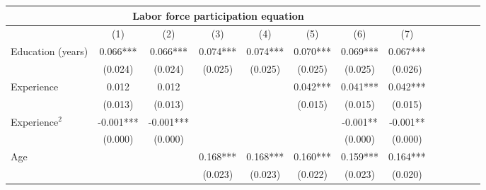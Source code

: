 \begin{center}
\begin{table}[th]
{\begin{tabular}{lcccccccccccc}
\multicolumn{8}{c}{\textbf{Labor force participation equation}}\\
\hline
\multicolumn{1}{c}{} &
  \multicolumn{1}{c}{(1)} &
  \multicolumn{1}{c}{(2)} &
  \multicolumn{1}{c}{(3)} &
  \multicolumn{1}{c}{(4)} &
  \multicolumn{1}{c}{(5)} &
  \multicolumn{1}{c}{(6)} &
  \multicolumn{1}{c}{(7)} \\
\cline{1-8}
\multicolumn{1}{l}{Education (years)} &
  \multicolumn{1}{c}{0.066***} &
  \multicolumn{1}{c}{0.066***} &
  \multicolumn{1}{c}{0.074***} &
  \multicolumn{1}{c}{0.074***} &
  \multicolumn{1}{c}{0.070***} &
  \multicolumn{1}{c}{0.069***} &
  \multicolumn{1}{c}{0.067***} \\
\multicolumn{1}{l}{} &
  \multicolumn{1}{c}{(0.024)} &
  \multicolumn{1}{c}{(0.024)} &
  \multicolumn{1}{c}{(0.025)} &
  \multicolumn{1}{c}{(0.025)} &
  \multicolumn{1}{c}{(0.025)} &
  \multicolumn{1}{c}{(0.025)} &
  \multicolumn{1}{c}{(0.026)} \\
\multicolumn{1}{l}{Experience} &
  \multicolumn{1}{c}{0.012} &
  \multicolumn{1}{c}{0.012} &
  \multicolumn{1}{c}{} &
  \multicolumn{1}{c}{} &
  \multicolumn{1}{c}{0.042***} &
  \multicolumn{1}{c}{0.041***} &
  \multicolumn{1}{c}{0.042***} \\
\multicolumn{1}{l}{} &
  \multicolumn{1}{c}{(0.013)} &
  \multicolumn{1}{c}{(0.013)} &
  \multicolumn{1}{c}{} &
  \multicolumn{1}{c}{} &
  \multicolumn{1}{c}{(0.015)} &
  \multicolumn{1}{c}{(0.015)} &
  \multicolumn{1}{c}{(0.015)} \\
\multicolumn{1}{l}{Experience$^2$} &
  \multicolumn{1}{c}{-0.001***} &
  \multicolumn{1}{c}{-0.001***} &
  \multicolumn{1}{c}{} &
  \multicolumn{1}{c}{} &
  \multicolumn{1}{c}{} &
  \multicolumn{1}{c}{-0.001**} &
  \multicolumn{1}{c}{-0.001**} \\
\multicolumn{1}{l}{} &
  \multicolumn{1}{c}{(0.000)} &
  \multicolumn{1}{c}{(0.000)} &
  \multicolumn{1}{c}{} &
  \multicolumn{1}{c}{} &
  \multicolumn{1}{c}{} &
  \multicolumn{1}{c}{(0.000)} &
  \multicolumn{1}{c}{(0.000)} \\
\multicolumn{1}{l}{Age} &
  \multicolumn{1}{c}{} &
  \multicolumn{1}{c}{} &
  \multicolumn{1}{c}{0.168***} &
  \multicolumn{1}{c}{0.168***} &
  \multicolumn{1}{c}{0.160***} &
  \multicolumn{1}{c}{0.159***} &
  \multicolumn{1}{c}{0.164***} \\
\multicolumn{1}{l}{} &
  \multicolumn{1}{c}{} &
  \multicolumn{1}{c}{} &
  \multicolumn{1}{c}{(0.023)} &
  \multicolumn{1}{c}{(0.023)} &
  \multicolumn{1}{c}{(0.022)} &
  \multicolumn{1}{c}{(0.023)} &
  \multicolumn{1}{c}{(0.020)} \\

\end{tabular}}
\end{table}
\end{center}
